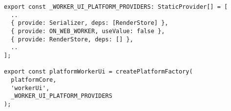 \begin{verbatim}
export const _WORKER_UI_PLATFORM_PROVIDERS: StaticProvider[] = [
  ..
  { provide: Serializer, deps: [RenderStore] },
  { provide: ON_WEB_WORKER, useValue: false },
  { provide: RenderStore, deps: [] },
  ..
];

export const platformWorkerUi = createPlatformFactory(
  platformCore,
  'workerUi',
  _WORKER_UI_PLATFORM_PROVIDERS
);
\end{verbatim}
